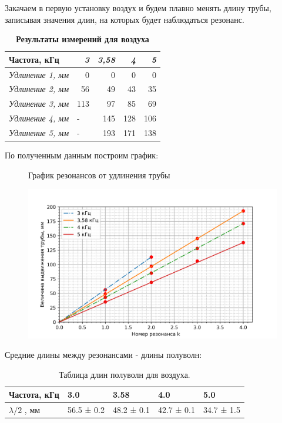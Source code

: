 \documentclass[11pt]{article}
\begin{document}
Закачаем в первую установку воздух и будем плавно менять длину трубы, записывая значения длин, на которых будет наблюдаться резонанс.




    \begin{table}[H]
    \centering
    \caption{\textbf{Результаты измерений для воздуха}}
    \begin{tabular}{|r|r|r|r|r|}
    \hline
    \multicolumn{1}{|l|}{\textbf{Частота, кГц}} & \textit{3} & \textit{3,58} & \textit{4} & \textit{5} \\ \hline
    \textit{Удлинение 1, мм} & 0 & 0 & 0 & 0 \\ \hline
    \textit{Удлинение 2, мм} & 56 & 49 & 43 & 35 \\ \hline
    \textit{Удлинение 3, мм} & 113 & 97 & 85 & 69 \\ \hline
    \textit{Удлинение 4, мм} & \multicolumn{1}{l|}{-} & 145 & 128 & 106 \\ \hline
    \textit{Удлинение 5, мм} & \multicolumn{1}{l|}{-} & 193 & 171 & 138 \\ \hline
    \end{tabular}   
    \end{table}


    По полученным данным построим график:

    \begin{figure}[H]
    \centering
    \caption{График резонансов от удлинения трубы}
    \includegraphics[width=\textwidth]{Gr1}
    \caption{}
    \end{figure}

Средние длины между резонансами - длины полуволн:

\begin{table}[H]
    \centering
    \caption{Таблица длин полуволн для воздуха.}
    \begin{tabular}{|l|l|l|l|l|}
    \hline
        Частота, кГц & 3.0  & 3.58  & 4.0  & 5.0 \\ \hline
        $\lambda/2$ , мм & 56.5 ± 0.2  & 48.2 ± 0.1  & 42.7 ± 0.1  & 34.7 ± 1.5 \\ \hline
    \end{tabular}
\end{table}
\end{document}
